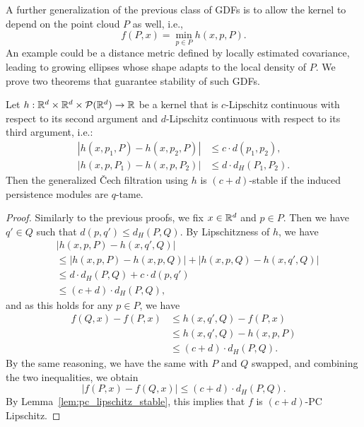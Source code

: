 A further generalization of the previous class of GDFs is to allow the kernel
to depend on the point cloud $P$ as well, i.e.,
\begin{equation}
    f(P, x) = \min_{p \in P} h(x, p, P).
\end{equation}
An example could be a distance metric defined by locally estimated covariance,
leading to growing ellipses whose shape adapts to the local density of $P$. We
prove two theorems that guarantee stability of such GDFs.
\begin{theorem}
    Let $h : \mathbb{R}^d \times \mathbb{R}^d \times \mathcal{P}(\mathbb{R}^d) \to \mathbb{R}$ be a kernel that
    is $c$-Lipschitz continuous with respect to its second argument and
    $d$-Lipschitz continuous with respect to its third argument, i.e.:
    \begin{align}
        |h(x, p_1, P) - h(x, p_2, P)| & \leq c \cdot d(p_1, p_2), \\
        |h(x, p, P_1) - h(x, p, P_2)| & \leq d \cdot d_H(P_1, P_2).
    \end{align}
    Then the generalized \v{C}ech filtration using $h$ is $(c + d)$-stable if
    the induced persistence modules are $q$-tame.
\end{theorem}
\begin{proof}
    Similarly to the previous proofs, we fix $x \in \mathbb{R}^d$ and $p \in P$.
    Then we have $q' \in Q$ such that $d(p, q') \leq d_H(P, Q)$.
    By Lipschitzness of $h$, we have
    \begin{align}
        & |h(x, p, P) - h(x, q', Q)| \\
        & \leq |h(x, p, P) - h(x, p, Q)| + |h(x, p, Q) - h(x, q', Q)| \\
        & \leq d \cdot d_H(P, Q) + c \cdot d(p, q') \\
        & \leq (c + d) \cdot d_H(P, Q),
    \end{align}
    and as this holds for any $p \in P$, we have
    \begin{align}
        f(Q, x) - f(P, x) & \leq h(x, q', Q) - f(P, x) \\
        & \leq h(x, q', Q) - h(x, p, P) \\
        & \leq (c + d) \cdot d_H(P, Q).
    \end{align}
    By the same reasoning, we have the same with $P$ and $Q$ swapped,
    and combining the two inequalities, we obtain
    \begin{equation}
        |f(P, x) - f(Q, x)| \leq (c + d) \cdot d_H(P, Q).
    \end{equation}
    By Lemma~\ref{lem:pc_lipschitz_stable}, this implies that $f$ is
    $(c + d)$-PC Lipschitz.
\end{proof}

